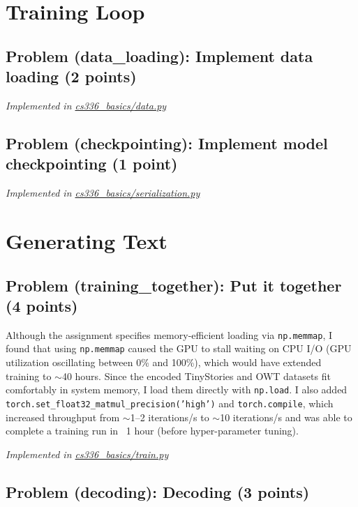\documentclass[letterpaper]{article}
\begin{document}
\section{Training Loop}

\subsection{Problem (data\_loading): Implement data loading (2 points)}

\textit{Implemented in  \href{https://github.com/echung32/ece405-assignment1-basics/blob/main/cs336_basics/data.py}{cs336\_basics/data.py}}

\subsection{Problem (checkpointing): Implement model checkpointing (1 point)}

\textit{Implemented in  \href{https://github.com/echung32/ece405-assignment1-basics/blob/main/cs336_basics/serialization.py}{cs336\_basics/serialization.py}}

\section{Generating Text}

\subsection{Problem (training\_together): Put it together (4 points)}

Although the assignment specifies memory-efficient loading via \texttt{np.memmap}, I found that using \texttt{np.memmap} caused the GPU to stall waiting on CPU I/O (GPU utilization oscillating between 0\% and 100\%), which would have extended training to $\sim$40 hours. Since the encoded TinyStories and OWT datasets fit comfortably in system memory, I load them directly with \texttt{np.load}. I also added \texttt{torch.set\_float32\_matmul\_precision('high')} and \texttt{torch.compile}, which  increased throughput from $\sim$1--2 iterations/s to $\sim$10 iterations/s and was able to complete a training run in ~1 hour (before hyper-parameter tuning).

\textit{Implemented in  \href{https://github.com/echung32/ece405-assignment1-basics/blob/main/cs336_basics/train.py}{cs336\_basics/train.py}}

\subsection{Problem (decoding): Decoding (3 points)}
\end{document}

